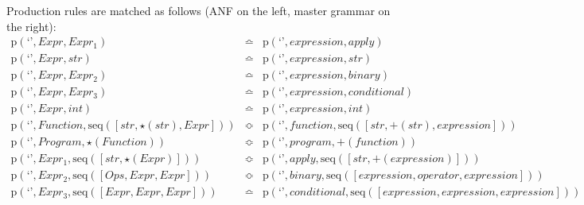 Production rules are matched as follows (ANF on the left, master grammar on the right):
\begin{eqnarray*}
\mathrm{p}\left(\text{`'},\mathit{Expr},\mathit{Expr_1}\right) & \bumpeq & \mathrm{p}\left(\text{`'},\mathit{expression},\mathit{apply}\right) \\
\mathrm{p}\left(\text{`'},\mathit{Expr},str\right) & \bumpeq & \mathrm{p}\left(\text{`'},\mathit{expression},str\right) \\
\mathrm{p}\left(\text{`'},\mathit{Expr},\mathit{Expr_2}\right) & \bumpeq & \mathrm{p}\left(\text{`'},\mathit{expression},\mathit{binary}\right) \\
\mathrm{p}\left(\text{`'},\mathit{Expr},\mathit{Expr_3}\right) & \bumpeq & \mathrm{p}\left(\text{`'},\mathit{expression},\mathit{conditional}\right) \\
\mathrm{p}\left(\text{`'},\mathit{Expr},int\right) & \bumpeq & \mathrm{p}\left(\text{`'},\mathit{expression},int\right) \\
\mathrm{p}\left(\text{`'},\mathit{Function},\mathrm{seq}\left(\left[str, \star \left(str\right), \mathit{Expr}\right]\right)\right) & \Bumpeq & \mathrm{p}\left(\text{`'},\mathit{function},\mathrm{seq}\left(\left[str, \plus \left(str\right), \mathit{expression}\right]\right)\right) \\
\mathrm{p}\left(\text{`'},\mathit{Program},\star \left(\mathit{Function}\right)\right) & \Bumpeq & \mathrm{p}\left(\text{`'},\mathit{program},\plus \left(\mathit{function}\right)\right) \\
\mathrm{p}\left(\text{`'},\mathit{Expr_1},\mathrm{seq}\left(\left[str, \star \left(\mathit{Expr}\right)\right]\right)\right) & \Bumpeq & \mathrm{p}\left(\text{`'},\mathit{apply},\mathrm{seq}\left(\left[str, \plus \left(\mathit{expression}\right)\right]\right)\right) \\
\mathrm{p}\left(\text{`'},\mathit{Expr_2},\mathrm{seq}\left(\left[\mathit{Ops}, \mathit{Expr}, \mathit{Expr}\right]\right)\right) & \Bumpeq & \mathrm{p}\left(\text{`'},\mathit{binary},\mathrm{seq}\left(\left[\mathit{expression}, \mathit{operator}, \mathit{expression}\right]\right)\right) \\
\mathrm{p}\left(\text{`'},\mathit{Expr_3},\mathrm{seq}\left(\left[\mathit{Expr}, \mathit{Expr}, \mathit{Expr}\right]\right)\right) & \bumpeq & \mathrm{p}\left(\text{`'},\mathit{conditional},\mathrm{seq}\left(\left[\mathit{expression}, \mathit{expression}, \mathit{expression}\right]\right)\right) \\
\end{eqnarray*}
